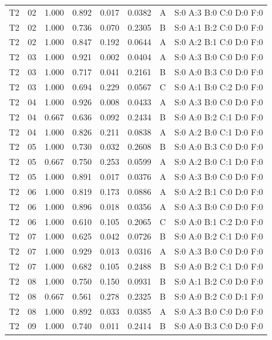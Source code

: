 \begin{longtable}{lrrrrrll}
T2 & 02 & 1.000 & 0.892 & 0.017 & 0.0382 & A & \tiny S:0 A:3 B:0 C:0 D:0 F:0 \\
T2 & 02 & 1.000 & 0.736 & 0.070 & 0.2305 & B & \tiny S:0 A:1 B:2 C:0 D:0 F:0 \\
T2 & 02 & 1.000 & 0.847 & 0.192 & 0.0644 & A & \tiny S:0 A:2 B:1 C:0 D:0 F:0 \\
T2 & 03 & 1.000 & 0.921 & 0.002 & 0.0404 & A & \tiny S:0 A:3 B:0 C:0 D:0 F:0 \\
T2 & 03 & 1.000 & 0.717 & 0.041 & 0.2161 & B & \tiny S:0 A:0 B:3 C:0 D:0 F:0 \\
T2 & 03 & 1.000 & 0.694 & 0.229 & 0.0567 & C & \tiny S:0 A:1 B:0 C:2 D:0 F:0 \\
T2 & 04 & 1.000 & 0.926 & 0.008 & 0.0433 & A & \tiny S:0 A:3 B:0 C:0 D:0 F:0 \\
T2 & 04 & 0.667 & 0.636 & 0.092 & 0.2434 & B & \tiny S:0 A:0 B:2 C:1 D:0 F:0 \\
T2 & 04 & 1.000 & 0.826 & 0.211 & 0.0838 & A & \tiny S:0 A:2 B:0 C:1 D:0 F:0 \\
T2 & 05 & 1.000 & 0.730 & 0.032 & 0.2608 & B & \tiny S:0 A:0 B:3 C:0 D:0 F:0 \\
T2 & 05 & 0.667 & 0.750 & 0.253 & 0.0599 & A & \tiny S:0 A:2 B:0 C:1 D:0 F:0 \\
T2 & 05 & 1.000 & 0.891 & 0.017 & 0.0376 & A & \tiny S:0 A:3 B:0 C:0 D:0 F:0 \\
T2 & 06 & 1.000 & 0.819 & 0.173 & 0.0886 & A & \tiny S:0 A:2 B:1 C:0 D:0 F:0 \\
T2 & 06 & 1.000 & 0.896 & 0.018 & 0.0356 & A & \tiny S:0 A:3 B:0 C:0 D:0 F:0 \\
T2 & 06 & 1.000 & 0.610 & 0.105 & 0.2065 & C & \tiny S:0 A:0 B:1 C:2 D:0 F:0 \\
T2 & 07 & 1.000 & 0.625 & 0.042 & 0.0726 & B & \tiny S:0 A:0 B:2 C:1 D:0 F:0 \\
T2 & 07 & 1.000 & 0.929 & 0.013 & 0.0316 & A & \tiny S:0 A:3 B:0 C:0 D:0 F:0 \\
T2 & 07 & 1.000 & 0.682 & 0.105 & 0.2488 & B & \tiny S:0 A:0 B:2 C:1 D:0 F:0 \\
T2 & 08 & 1.000 & 0.750 & 0.150 & 0.0931 & B & \tiny S:0 A:1 B:2 C:0 D:0 F:0 \\
T2 & 08 & 0.667 & 0.561 & 0.278 & 0.2325 & B & \tiny S:0 A:0 B:2 C:0 D:1 F:0 \\
T2 & 08 & 1.000 & 0.892 & 0.033 & 0.0385 & A & \tiny S:0 A:3 B:0 C:0 D:0 F:0 \\
T2 & 09 & 1.000 & 0.740 & 0.011 & 0.2414 & B & \tiny S:0 A:0 B:3 C:0 D:0 F:0 \\

\end{longtable}
